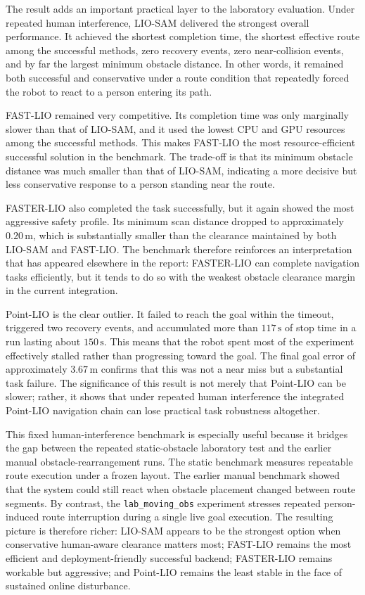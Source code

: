 \documentclass[12pt,a4paper]{report}
\begin{document}
The result adds an important practical layer to the laboratory evaluation. Under repeated human interference, LIO-SAM delivered the strongest overall performance. It achieved the shortest completion time, the shortest effective route among the successful methods, zero recovery events, zero near-collision events, and by far the largest minimum obstacle distance. In other words, it remained both successful and conservative under a route condition that repeatedly forced the robot to react to a person entering its path.

FAST-LIO remained very competitive. Its completion time was only marginally slower than that of LIO-SAM, and it used the lowest CPU and GPU resources among the successful methods. This makes FAST-LIO the most resource-efficient successful solution in the benchmark. The trade-off is that its minimum obstacle distance was much smaller than that of LIO-SAM, indicating a more decisive but less conservative response to a person standing near the route.

FASTER-LIO also completed the task successfully, but it again showed the most aggressive safety profile. Its minimum scan distance dropped to approximately \(0.20\,\mathrm{m}\), which is substantially smaller than the clearance maintained by both LIO-SAM and FAST-LIO. The benchmark therefore reinforces an interpretation that has appeared elsewhere in the report: FASTER-LIO can complete navigation tasks efficiently, but it tends to do so with the weakest obstacle clearance margin in the current integration.

Point-LIO is the clear outlier. It failed to reach the goal within the timeout, triggered two recovery events, and accumulated more than \(117\,\mathrm{s}\) of stop time in a run lasting about \(150\,\mathrm{s}\). This means that the robot spent most of the experiment effectively stalled rather than progressing toward the goal. The final goal error of approximately \(3.67\,\mathrm{m}\) confirms that this was not a near miss but a substantial task failure. The significance of this result is not merely that Point-LIO can be slower; rather, it shows that under repeated human interference the integrated Point-LIO navigation chain can lose practical task robustness altogether.

This fixed human-interference benchmark is especially useful because it bridges the gap between the repeated static-obstacle laboratory test and the earlier manual obstacle-rearrangement runs. The static benchmark measures repeatable route execution under a frozen layout. The earlier manual benchmark showed that the system could still react when obstacle placement changed between route segments. By contrast, the \texttt{lab\_moving\_obs} experiment stresses repeated person-induced route interruption during a single live goal execution. The resulting picture is therefore richer: LIO-SAM appears to be the strongest option when conservative human-aware clearance matters most; FAST-LIO remains the most efficient and deployment-friendly successful backend; FASTER-LIO remains workable but aggressive; and Point-LIO remains the least stable in the face of sustained online disturbance.
\end{document}
